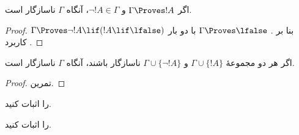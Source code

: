 \documentclass[../../../include/open-logic-section]{subfiles}
\begin{document}
\begin{prop}
  اگر $\Gamma \Proves !A$ و $\lnot !A \in \Gamma$، آنگاه $\Gamma$
  ناسازگار است.
\end{prop}

\begin{proof}
  $\Gamma \Proves \lnot !A \lif (!A \lif \lfalse)$ بنا بر
  .
  $\Gamma \Proves \lfalse$ با دو بار کاربرد
  .
\end{proof}


\begin{prop}
  اگر هر دو مجموعهٔ $\Gamma \cup \{!A\}$ و
  $\Gamma \cup \{\lnot !A\}$ ناسازگار باشند، آنگاه $\Gamma$ ناسازگار
  است.
\end{prop}

\begin{proof}
تمرین.
\end{proof}

\begin{prob}
   را اثبات کنید.
\end{prob}
\tagendprob

\begin{prob}
   را اثبات کنید.
\end{prob}
\tagendprob
\end{document}
